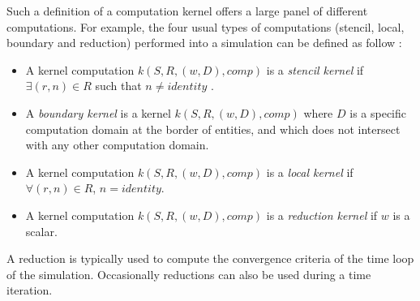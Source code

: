 Such a definition of a computation kernel offers a large panel of different computations. For example, the four usual types of computations (stencil, local, boundary and reduction) performed into a simulation can be defined as follow :
\begin{itemize}
\item A kernel computation $k(S,R,(w,D),comp)$ is a \emph{stencil kernel} if $\exists (r,n) \in R$ such that $n \neq identity$ .
\item A \emph{boundary kernel} is a kernel $k(S,R,(w,D),comp)$ where $D$ is a specific computation domain at the border of entities, and which does not intersect with any other computation domain.
\item A kernel computation $k(S,R,(w,D),comp)$ is a \emph{local kernel} if $\forall (r,n) \in R$, $n = identity$.
\item A kernel computation $k(S,R,(w,D),comp)$ is a \emph{reduction kernel} if $w$ is a scalar.%
\end{itemize}





A reduction is typically used to compute the convergence criteria of the time loop of the simulation. Occasionally reductions can also be used during a time iteration.


